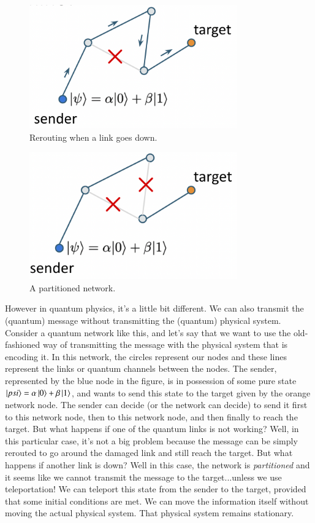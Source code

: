 \begin{figure}[H]
    \centering
    \includegraphics[width=0.8\textwidth]{lesson8/link-down.png}
        \caption{Rerouting when a link goes down.}
    \label{fig:link-down}
\end{figure}
\begin{figure}[H]
    \centering
    \includegraphics[width=0.8\textwidth]{lesson8/partitioned.png}
        \caption{A partitioned network.}
    \label{fig:partition}
\end{figure}


However in quantum physics, it's a little bit different. We can also transmit the (quantum) message without transmitting the (quantum) physical system. Consider a quantum network like this,  and let's say that we want to use the old-fashioned way of transmitting the message with the physical system that is encoding it. In this network, the circles represent our nodes and these lines represent the links or quantum channels between the nodes. The sender, represented by the blue node in the figure, is in possession of some pure state $\ket{psi} = \alpha\ket{0}+\beta\ket{1}$, and  wants to send this state to the target given by the orange network node. The sender can decide (or the network can decide) to send it first to this network node, then to this network node, and then finally to reach the target. But what happens if one of the quantum links is not working? Well, in this particular case, it's not a big problem because the message can be simply rerouted to go around the damaged link and still reach the target. But what happens if another link is down? Well in this case, the network is \emph{partitioned} and it seems like we cannot transmit the message to the target...unless we use teleportation! We can teleport this state from the sender to the target, provided that some initial conditions are met. We can move the information itself without moving the actual physical system. That physical system remains stationary.

